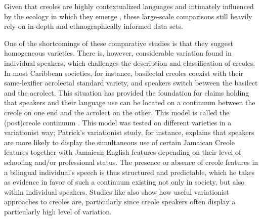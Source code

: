 \documentclass[output=paper,
modfonts
]{langscibook}
\begin{document}
\noindent Given that creoles are highly contextualized languages and intimately influenced by the ecology in which they emerge \citep{jourdan2008cultural}, these large-scale comparisons still heavily rely on in-depth and ethnographically informed data sets.

One of the shortcomings of these comparative studies is that they suggest homogeneous varieties. There is, however, considerable variation found in individual speakers, which challenges the description and classification of creoles. In most Caribbean societies, for instance, basilectal creoles coexist with their same-lexifier acrolectal standard variety, and speakers switch between the basilect and the acrolect. This situation has provided the foundation for claims holding that speakers and their language use can be located on a continuum between the creole on one end and the acrolect on the other. This model is called the (post)creole continuum \citep[cf][]{decamp1971toward}. This model was tested on different varieties in a variationist way; Patrick’s \citeyear{patrick1999urban} variationist study, for instance, explains that speakers are more likely to display the simultaneous use of certain Jamaican Creole features together with Jamaican English features depending on their level of schooling and/or professional status. The presence or absence of creole features in a bilingual individual’s speech is thus structured and predictable, which he takes as evidence in favor of such a continuum existing not only in society, but also within individual speakers. Studies like \cite{patrick1999urban} also show how useful variationist approaches to creoles are, particularly since creole speakers often display a particularly high level of variation.
\end{document}
